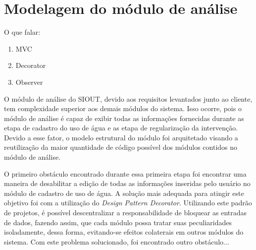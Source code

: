 \section{Modelagem do módulo de análise}

O que falar:
\begin{enumerate}
\item MVC
\item Decorator
\item Observer
\end{enumerate}

O módulo de análise do SIOUT, devido aos requisitos levantados junto ao cliente, tem complexidade superior aos demais módulos do sistema. Isso ocorre, pois o módulo de análise é capaz de exibir todas as informações fornecidas durante as etapa de cadastro do uso de água e as etapa de regularização da intervenção. Devido a esse fator, o modelo estrutural do módulo foi arquitetado visando a reutilização da maior quantidade de código possível dos módulos contidos no módulo de análise.

O primeiro obstáculo encontrado durante essa primeira etapa foi encontrar uma maneira de desabilitar a edição de todas as informações inseridas pelo usuário no módulo de cadastro de uso de água. A solução mais adequada para atingir este objetivo foi com a utilização do \textit{Design Pattern Decorator}. Utilizando este padrão de projetos, é possível descentralizar a responsabilidade de bloquear as entradas de dados, fazendo assim, que cada módulo possa tratar suas peculiaridades isoladamente, dessa forma, evitando-se efeitos colaterais em outros módulos do sistema. Com este problema solucionado, foi encontrado outro obstáculo...






